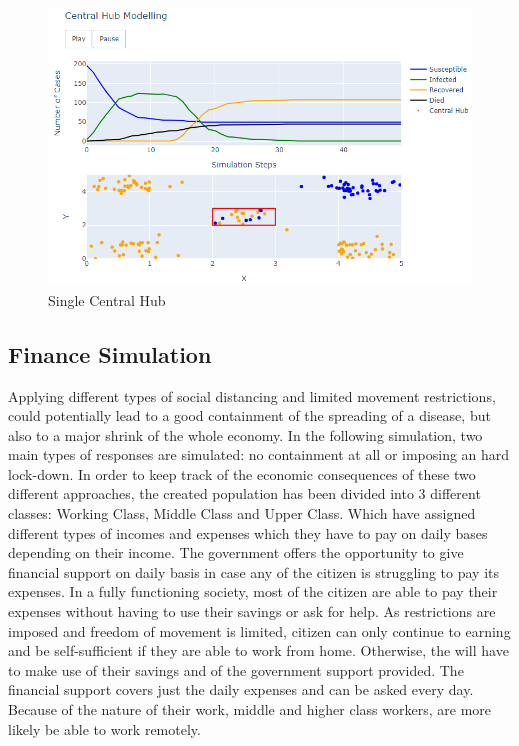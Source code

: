 \begin{figure}[ht!]%
    \centering
    \includegraphics[width=13cm]{latex/images/hubs1.PNG}%
    \caption{Single Central Hub}
    \label{hub}
\end{figure}

\subsection{Finance Simulation}

Applying different types of social distancing and limited movement restrictions, could potentially lead to a good containment of the spreading of a disease, but also to a major shrink of the whole economy. In the following simulation, two main types of responses are simulated: no containment at all or imposing an hard lock-down. In order to keep track of the economic consequences of these two different approaches, the created population has been divided into 3 different classes: Working Class, Middle Class and Upper Class. Which have assigned different types of incomes and expenses which they have to pay on daily bases depending on their income. The government offers the opportunity to give financial support on daily basis in case any of the citizen is struggling to pay its expenses. In a fully functioning society, most of the citizen are able to pay their expenses without having to use their savings or ask for help. As restrictions are imposed and freedom of movement is limited, citizen can only continue to earning and be self-sufficient if they are able to work from home. Otherwise, the will have to make use of their savings and of the government support provided. The financial support covers just the daily expenses and can be asked every day. Because of the nature of their work, middle and higher class workers, are more likely be able to work remotely.

